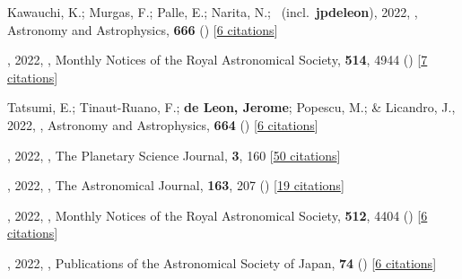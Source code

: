 \item[{\color{numcolor}\scriptsize56}] Kawauchi, K.; Murgas, F.; Palle, E.; Narita, N.; \etal\ (incl.\ \textbf{jpdeleon}), 2022, , Astronomy and Astrophysics, \textbf{666} () [\href{https://ui.adsabs.harvard.edu/abs/2022A&A...666A...4K}{6 citations}]

\item[{\color{numcolor}\scriptsize55}] , 2022, , Monthly Notices of the Royal Astronomical Society, \textbf{514}, 4944 () [\href{https://ui.adsabs.harvard.edu/abs/2022MNRAS.514.4944C}{7 citations}]

\item[{\color{numcolor}\scriptsize54}] Tatsumi, E.; Tinaut-Ruano, F.; \textbf{de Leon, Jerome}; Popescu, M.; \& Licandro, J., 2022, , Astronomy and Astrophysics, \textbf{664} () [\href{https://ui.adsabs.harvard.edu/abs/2022A&A...664A.107T}{6 citations}]

\item[{\color{numcolor}\scriptsize53}] , 2022, , The Planetary Science Journal, \textbf{3}, 160 [\href{https://ui.adsabs.harvard.edu/abs/2022PSJ.....3..160M}{50 citations}]

\item[{\color{numcolor}\scriptsize52}] , 2022, , The Astronomical Journal, \textbf{163}, 207 () [\href{https://ui.adsabs.harvard.edu/abs/2022AJ....163..207C}{19 citations}]

\item[{\color{numcolor}\scriptsize51}] , 2022, , Monthly Notices of the Royal Astronomical Society, \textbf{512}, 4404 () [\href{https://ui.adsabs.harvard.edu/abs/2022MNRAS.512.4404W}{6 citations}]

\item[{\color{numcolor}\scriptsize50}] , 2022, , Publications of the Astronomical Society of Japan, \textbf{74} () [\href{https://ui.adsabs.harvard.edu/abs/2022PASJ...74L...1F}{6 citations}]

